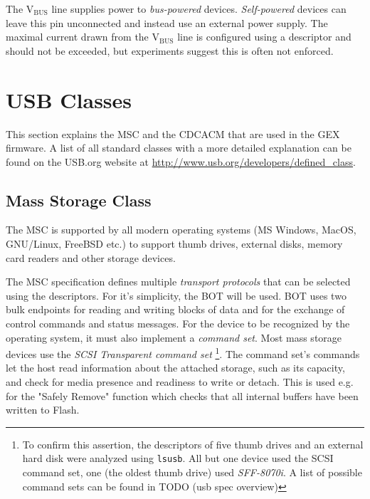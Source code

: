The V$_\mathrm{BUS}$ line supplies power to \textit{bus-powered} devices. \textit{Self-powered} devices can leave this pin unconnected and instead use an external power supply. The maximal current drawn from the V$_\mathrm{BUS}$ line is configured using a descriptor and should not be exceeded, but experiments suggest this is often not enforced.

\section{USB Classes}

This section explains the \gls{MSC} and the \gls{CDCACM} that are used in the GEX firmware. A list of all standard classes with a more detailed explanation can be found on the USB.org website at \url{http://www.usb.org/developers/defined\_class}.

\subsection{Mass Storage Class}

The \gls{MSC} is supported by all modern operating systems (MS Windows, MacOS, GNU/Linux, FreeBSD etc.) to support thumb drives, external disks, memory card readers and other storage devices.


The \gls{MSC} specification defines multiple \textit{transport protocols} that can be selected using the descriptors. For it's simplicity, the \gls{BOT} will be used. \gls{BOT} uses two bulk endpoints for reading and writing blocks of data and for the exchange of control commands and status messages. For the device to be recognized by the operating system, it must also implement a \textit{command set}. Most mass storage devices use the \textit{\gls{SCSI} Transparent command set}
\footnote{To confirm this assertion, the descriptors of five thumb drives and an external hard disk were analyzed using \verb|lsusb|. All but one device used the SCSI command set, one (the oldest thumb drive) used \textit{SFF-8070i}. A list of possible command sets can be found in TODO (usb spec overview)}.
The command set's commands let the host read information about the attached storage, such as its capacity, and check for media presence and readiness to write or detach. This is used e.g. for the "Safely Remove" function which checks that all internal buffers have been written to Flash.

